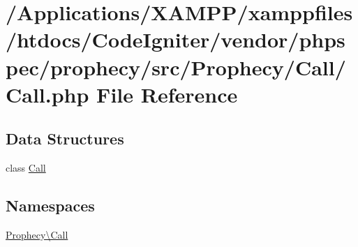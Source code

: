 \hypertarget{_call_8php}{}\section{/\+Applications/\+X\+A\+M\+P\+P/xamppfiles/htdocs/\+Code\+Igniter/vendor/phpspec/prophecy/src/\+Prophecy/\+Call/\+Call.php File Reference}
\label{_call_8php}
\subsection*{Data Structures}
\begin{DoxyCompactItemize}
\item 
class \mbox{\hyperlink{class_prophecy_1_1_call_1_1_call}{Call}}
\end{DoxyCompactItemize}
\subsection*{Namespaces}
\begin{DoxyCompactItemize}
\item 
 \mbox{\hyperlink{namespace_prophecy_1_1_call}{Prophecy\textbackslash{}\+Call}}
\end{DoxyCompactItemize}
